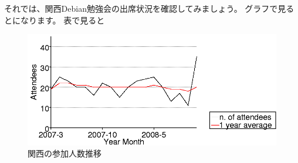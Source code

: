 \documentclass[mingoth,a4paper]{jsarticle}
\begin{document}
それでは、関西Debian勉強会の出席状況を確認してみましょう。
グラフで見るとになります。
表で見ると

\begin{figure}[h]
 \begin{center}
  \includegraphics[width=1\hsize]{image200812/kansai.png}
 \end{center}
\caption{関西の参加人数推移}
\label{fig:kansaipeoplechart}
\end{figure}
\end{document}
